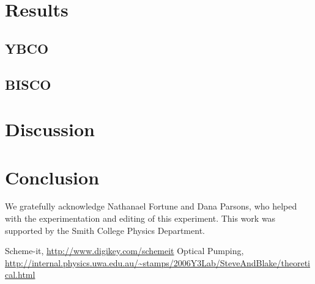 \documentclass[prb,preprint]{revtex4-1}
\begin{document}
\section{Results}

\subsection{YBCO}

\subsection{BISCO}



\section{Discussion}

\section{Conclusion}


\begin{acknowledgments}

We gratefully acknowledge Nathanael Fortune and Dana Parsons, who helped with the experimentation and editing of this experiment. This work was supported by the Smith College Physics Department.

\end{acknowledgments}


\begin{thebibliography}{99}

 Scheme-it, \url{http://www.digikey.com/schemeit}
 Optical Pumping, \url{http://internal.physics.uwa.edu.au/~stamps/2006Y3Lab/SteveAndBlake/theoretical.html}

\end{thebibliography}

\end{document}
